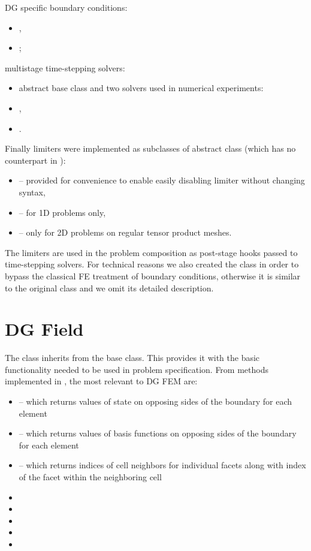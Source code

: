 \noindent DG specific boundary conditions:
\begin{itemize}
    \item {},
    \item {};
\end{itemize}
multistage time-stepping solvers:
\begin{itemize}
    \item abstract base class  and two solvers used in numerical experiments:
    \item {},
    \item {}.
\end{itemize}
Finally limiters were implemented as subclasses of  abstract class (which has no
counterpart in \sfepy{}):
\begin{itemize}
    \item {} -- provided for convenience to enable
    easily disabling limiter without changing
    syntax,
    \item {} -- for 1D problems only,
    \item {} -- only for 2D problems on regular tensor
    product meshes.
\end{itemize}
The limiters are used in the problem composition as post-stage hooks passed to 
time-stepping solvers. For technical reasons we also created the  
class in order to bypass the classical FE treatment of boundary conditions, otherwise it 
is similar to the original \sfepy{}  class and we omit its detailed 
description.


\section{DG Field}
The  class inherits from the  base class. This provides it with the basic
functionality needed to be used in problem specification. From methods implemented in
, the most relevant to DG FEM are:
\begin{itemize}
    \item {} -- which returns values of state on opposing sides of
    the boundary for each element
    \item {} -- which returns values of basis functions on opposing
    sides of the boundary for each element
    \item {} -- which returns indices of cell neighbors for individual
    facets along with index of the facet within the neighboring cell
    \item {}
    \item {}
    \item {}
    \item {}
    \item {}
\end{itemize}

